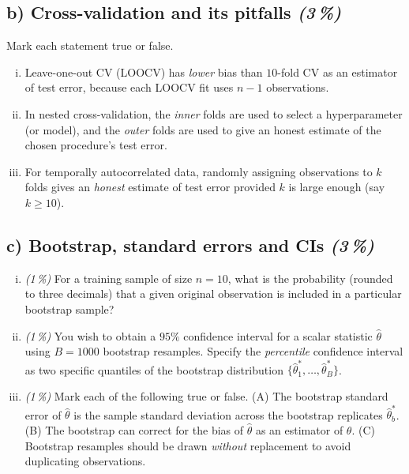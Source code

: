 \documentclass[11pt,a4paper]{article}
\newcommand{\subpoints}[1]{\textit{(#1\,\%)}}
\begin{document}
\subsection*{b) Cross-validation and its pitfalls \subpoints{3}}
Mark each statement true or false.
\begin{enumerate}[(i)]
  \item Leave-one-out CV (LOOCV) has \emph{lower} bias than $10$-fold CV as an estimator of test error, because each LOOCV fit uses $n-1$ observations.
  \item In nested cross-validation, the \emph{inner} folds are used to select a hyperparameter (or model), and the \emph{outer} folds are used to give an honest estimate of the chosen procedure's test error.
  \item For temporally autocorrelated data, randomly assigning observations to $k$ folds gives an \emph{honest} estimate of test error provided $k$ is large enough (say $k \ge 10$).
\end{enumerate}

\subsection*{c) Bootstrap, standard errors and CIs \subpoints{3}}

\begin{enumerate}[(i)]
  \item \subpoints{1} For a training sample of size $n = 10$, what is the probability (rounded to three decimals) that a given original observation is included in a particular bootstrap sample?
  \item \subpoints{1} You wish to obtain a $95\%$ confidence interval for a scalar statistic $\hat\theta$ using $B = 1000$ bootstrap resamples. Specify the \emph{percentile} confidence interval as two specific quantiles of the bootstrap distribution $\{\hat\theta^*_1, \ldots, \hat\theta^*_B\}$.
  \item \subpoints{1} Mark each of the following true or false. (A) The bootstrap standard error of $\hat\theta$ is the sample standard deviation across the bootstrap replicates $\hat\theta^*_b$. (B) The bootstrap can correct for the bias of $\hat\theta$ as an estimator of $\theta$. (C) Bootstrap resamples should be drawn \emph{without} replacement to avoid duplicating observations.
\end{enumerate}
\end{document}
